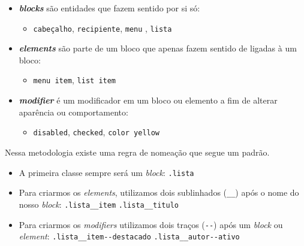 \begin{itemize}
\tightlist
\item
  \textbf{\emph{blocks}} são entidades que fazem sentido por si só:

  \begin{itemize}
  \tightlist
  \item
    \texttt{cabeçalho}, \texttt{recipiente}, \texttt{menu} , \texttt{lista}
  \end{itemize}
\item
  \textbf{\emph{elements}} são parte de um bloco que apenas fazem
  sentido de ligadas à um bloco:

  \begin{itemize}
  \tightlist
  \item
    \texttt{menu\ item}, \texttt{list\ item}
  \end{itemize}
\item
  \textbf{\emph{modifier}} é um modificador em um bloco ou elemento a
  fim de alterar aparência ou comportamento:

  \begin{itemize}
  \tightlist
  \item
    \texttt{disabled}, \texttt{checked}, \texttt{color\ yellow}
  \end{itemize}
\end{itemize}

Nessa metodologia existe uma regra de nomeação que segue um padrão.

\begin{itemize}
\tightlist
    \item 
        A primeira classe sempre será um \emph{block}: \texttt{.lista}
        
    \item
        Para criarmos os \emph{elements}, utilizamos dois sublinhados (\texttt{\_\_}) após o nome do nosso \emph{block}: \texttt{.lista\_\_item}   \texttt{.lista\_\_titulo}
        
    \item
        Para criarmos os \emph{modifiers} utilizamos dois traços (\texttt{-{}-}) após um \emph{block} ou \emph{element}:  \texttt{.lista\_\_item-{}-destacado}   \texttt{.lista\_\_autor-{}-ativo}
        
\end{itemize}

